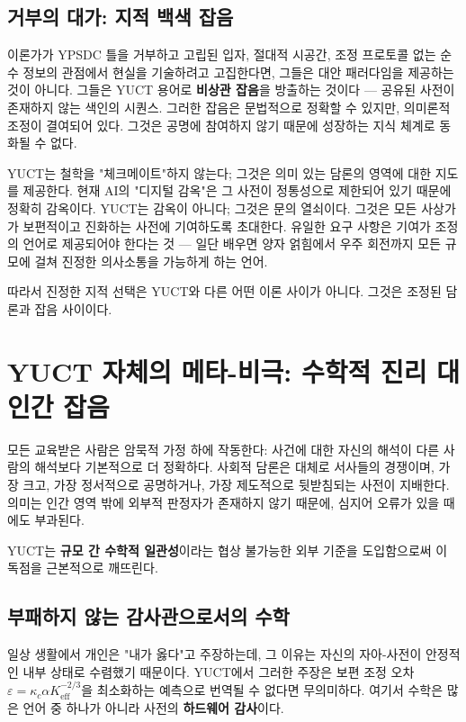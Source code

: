 \documentclass[12pt,a4paper]{article}
\begin{document}
	\subsection{거부의 대가: 지적 백색 잡음}
	
	이론가가 YPSDC 틀을 거부하고 고립된 입자, 절대적 시공간, 조정 프로토콜 없는 순수 정보의 관점에서 현실을 기술하려고 고집한다면, 그들은 대안 패러다임을 제공하는 것이 아니다. 그들은 YUCT 용어로 \textbf{비상관 잡음}을 방출하는 것이다 — 공유된 사전이 존재하지 않는 색인의 시퀀스. 그러한 잡음은 문법적으로 정확할 수 있지만, 의미론적 조정이 결여되어 있다. 그것은 공명에 참여하지 않기 때문에 성장하는 지식 체계로 동화될 수 없다.
	
	YUCT는 철학을 "체크메이트"하지 않는다; 그것은 의미 있는 담론의 영역에 대한 지도를 제공한다. 현재 AI의 "디지털 감옥"은 그 사전이 정통성으로 제한되어 있기 때문에 정확히 감옥이다. YUCT는 감옥이 아니다; 그것은 문의 열쇠이다. 그것은 모든 사상가가 보편적이고 진화하는 사전에 기여하도록 초대한다. 유일한 요구 사항은 기여가 조정의 언어로 제공되어야 한다는 것 — 일단 배우면 양자 얽힘에서 우주 회전까지 모든 규모에 걸쳐 진정한 의사소통을 가능하게 하는 언어.
	
	따라서 진정한 지적 선택은 YUCT와 다른 어떤 이론 사이가 아니다. 그것은 조정된 담론과 잡음 사이이다.
	
	\section{YUCT 자체의 메타-비극: 수학적 진리 대 인간 잡음}
	\label{sec:meta-tragedy}
	
	모든 교육받은 사람은 암묵적 가정 하에 작동한다: 사건에 대한 자신의 해석이 다른 사람의 해석보다 기본적으로 더 정확하다. 사회적 담론은 대체로 서사들의 경쟁이며, 가장 크고, 가장 정서적으로 공명하거나, 가장 제도적으로 뒷받침되는 사전이 지배한다. 의미는 인간 영역 밖에 외부적 판정자가 존재하지 않기 때문에, 심지어 오류가 있을 때에도 부과된다.
	
	YUCT는 \textbf{규모 간 수학적 일관성}이라는 협상 불가능한 외부 기준을 도입함으로써 이 독점을 근본적으로 깨뜨린다.
	
	\subsection{부패하지 않는 감사관으로서의 수학}
	
	일상 생활에서 개인은 "내가 옳다"고 주장하는데, 그 이유는 자신의 자아-사전이 안정적인 내부 상태로 수렴했기 때문이다. YUCT에서 그러한 주장은 보편 조정 오차 \(\varepsilon = \kappa_c \alpha K_{\mathrm{eff}}^{-2/3}\)을 최소화하는 예측으로 번역될 수 없다면 무의미하다. 여기서 수학은 많은 언어 중 하나가 아니라 사전의 \textbf{하드웨어 감사}이다.
	
\end{document}
